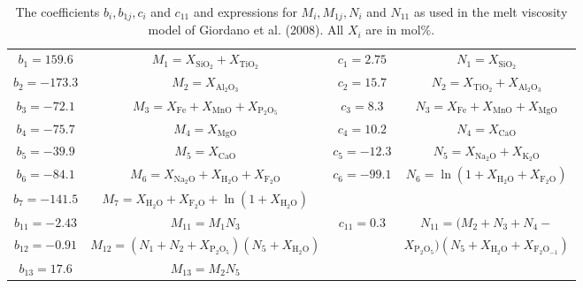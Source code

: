 \documentclass[]{book}
\theoremstyle{definition}
\begin{document}
\begin{enumerate}
  \begin{table}
    \caption{The coefficients $b_{i}, b_{1j}, c_{i}$ and $c_{11}$ and expressions for $M_{i}, M_{1j}, N_{i}$ and $N_{11}$ as used in the melt viscosity model of Giordano et al. (2008). All $X_{i}$ are in mol\%.\label{tab:viscos}}
    \begin{tabular}{|c|c||c|c|}
      \hline
      $b_{1} = 159.6$ & $M_{1} = X_{\text{SiO}_{2}} + X_{\text{TiO}_{2}}$ & $c_{1} = 2.75$ & $N_{1} = X_{\text{SiO}_{2}}$ \\
      $b_{2} = -173.3$ & $M_{2} = X_{\text{Al}_{2}\text{O}_{3}}$ & $c_{2} = 15.7$ & $N_{2} = X_{\text{TiO}_{2}} + X_{\text{Al}_{2}\text{O}_{3}}$ \\
      $b_{3} = -72.1$ & $M_{3} = X_{\text{Fe}} + X_{\text{MnO}} + X_{\text{P}_{2}\text{O}_{5}}$ & $c_{3} = 8.3$ & $N_{3} = X_{\text{Fe}} + X_{\text{MnO}} + X_{\text{MgO}}$ \\
      $b_{4} = -75.7$ & $M_{4} = X_{\text{MgO}}$ & $c_{4} = 10.2$ & $N_{4} = X_{\text{CaO}}$ \\
      $b_{5} = -39.9$ & $M_{5} = X_{\text{CaO}}$ & $c_{5} = -12.3$ & $N_{5} = X_{\text{Na}_{2}\text{O}} + X_{\text{K}_{2}\text{O}}$ \\
      $b_{6} = -84.1$ & $M_{6} = X_{\text{Na}_{2}\text{O}} + X_{\text{H}_{2}\text{O}} + X_{\text{F}_{2}\text{O}}$ & $c_{6} = -99.1$ & $N_{6} = \ln(1 + X_{\text{H}_{2}\text{O}} + X_{\text{F}_{2}\text{O}})$ \\
      $b_{7} = -141.5$ & $M_{7} = X_{\text{H}_{2}\text{O}} + X_{\text{F}_{2}\text{O}} + \ln(1 + X_{\text{H}_{2}\text{O}})$& &  \\
      \hline
      $b_{11} = -2.43$ & $M_{11} = M_{1} N_{3}$ & $c_{11} = 0.3$& $N_{11} = (M_{2} + N_{3} + N_{4} - $\\
      $b_{12} = -0.91$ & $M_{12} = (N_{1} + N_{2} + X_{\text{P}_{2}\text{O}_{5}}) (N_{5} + X_{\text{H}_{2}\text{O}})$ & & $X_{\text{P}_{2}\text{O}_{5}}) (N_{5} + X_{\text{H}_{2}\text{O}} + X_{\text{F}_{2}\text{O}_{-1}})$ \\
      $b_{13} = 17.6$ & $M_{13} = M_{2} N_{5}$ & &  \\    
      \hline
    \end{tabular}
  \end{table}


\end{enumerate}
\end{document}
